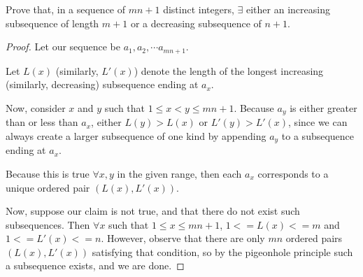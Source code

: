 \documentclass[a4paper]{scrartcl}
\begin{document}
\begin{example*}
	Prove that, in a sequence of $mn + 1$ distinct integers, $\exists$ either an increasing subsequence of length $m+1$ or a decreasing subsequence of $n+1$.
\end{example*}
\begin{proof}
	Let our sequence be $a_1, a_2, \cdots a_{mn+1}$.

	Let $L(x)$ (similarly, $L'(x)$) denote the length of the longest increasing (similarly, decreasing) subsequence ending at $a_x$.

	Now, consider $x$ and $y$ such that $1 \leq x < y \leq mn + 1$. Because $a_y$ is either greater than or less than $a_x$, either $L(y) > L(x)$ or $L'(y) > L'(x)$, since we can always create a larger subsequence of one kind by appending $a_y$ to a subsequence ending at $a_x$.

	Because this is true $\forall x,y$ in the given range, then each $a_x$ corresponds to a unique ordered pair $(L(x), L'(x))$.

	Now, suppose our claim is not true, and that there do not exist such subsequences. Then $\forall x $ such that $1 \leq x \leq mn+1$, $1 <= L(x) <= m$ and $1 <= L'(x) <= n$. However, observe that there are only $mn$ ordered pairs $(L(x), L'(x))$ satisfying that condition, so by the pigeonhole principle such a subsequence exists, and we are done.

\end{proof}
\end{document}
